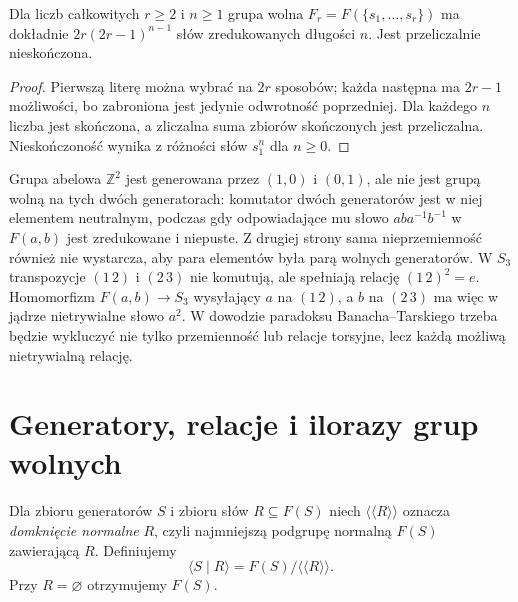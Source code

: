 \begin{stwierdzenie}
\label{aa:st:free-count}
\label{st:przeliczalnosc-f2}
Dla liczb całkowitych $r\ge2$ i $n\ge1$ grupa wolna
$F_r=F(\{s_1,\ldots,s_r\})$ ma dokładnie
$2r(2r-1)^{n-1}$ słów zredukowanych długości $n$.
Jest przeliczalnie nieskończona.
\end{stwierdzenie}
\begin{proof}
Pierwszą literę można wybrać na $2r$ sposobów;
każda następna ma $2r-1$ możliwości, bo zabroniona jest
jedynie odwrotność poprzedniej. Dla każdego $n$ liczba jest
skończona, a zliczalna suma zbiorów skończonych jest przeliczalna.
Nieskończoność wynika z różności słów $s_1^n$ dla $n\ge0$.
\end{proof}


\begin{przyklad}
\label{aa:prz:free-nonfree-pairs}
Grupa abelowa $\mathbb Z^2$ jest generowana przez
$(1,0)$ i $(0,1)$, ale nie jest grupą wolną na tych dwóch
generatorach: komutator dwóch generatorów jest w niej elementem neutralnym,
podczas gdy odpowiadające mu słowo $aba^{-1}b^{-1}$
w $F(a,b)$ jest zredukowane i niepuste.
Z drugiej strony sama nieprzemienność również nie wystarcza,
aby para elementów była parą wolnych generatorów.
W $S_3$ transpozycje $(1\,2)$ i $(2\,3)$ nie komutują,
ale spełniają relację $(1\,2)^2=e$.
Homomorfizm $F(a,b)\to S_3$ wysyłający $a$ na $(1\,2)$,
a $b$ na $(2\,3)$ ma więc w jądrze nietrywialne słowo $a^2$.
W dowodzie paradoksu Banacha--Tarskiego trzeba będzie
wykluczyć nie tylko przemienność lub relacje torsyjne,
lecz każdą możliwą nietrywialną relację.
\end{przyklad}

\section{Generatory, relacje i ilorazy grup wolnych}
\begin{definicja}
\label{aa:def:presentation}
Dla zbioru generatorów $S$ i zbioru słów $R\subseteq F(S)$
niech $\langle\!\langle R\rangle\!\rangle$ oznacza
\emph{domknięcie normalne} $R$, czyli najmniejszą
podgrupę normalną $F(S)$ zawierającą $R$.
Definiujemy
\[
\langle S\mid R\rangle
 =F(S)/\langle\!\langle R\rangle\!\rangle.
\]
Przy $R=\varnothing$ otrzymujemy $F(S)$.
\end{definicja}

